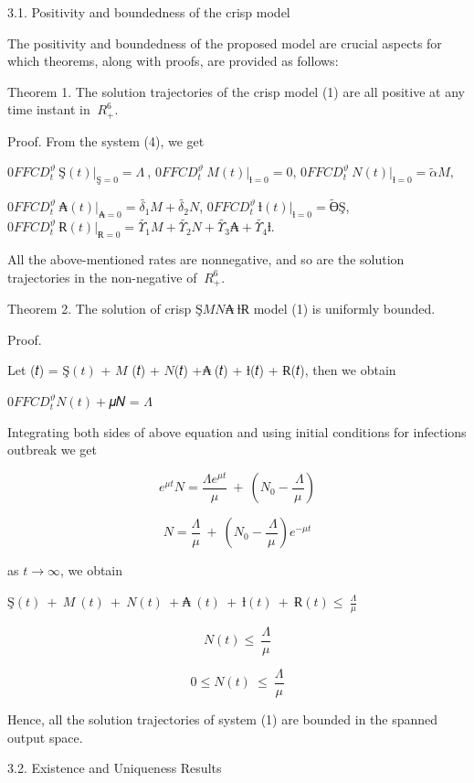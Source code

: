 3.1. Positivity and boundedness of the crisp model

The positivity and boundedness of the proposed model are crucial aspects for which theorems, along with proofs, are provided as follows:

Theorem 1. The solution trajectories of the crisp model (1) are all positive at any time instant in \({\ R}_{+}^{6}\).

Proof. From the system (4), we get

\({0FFCD_{t}^{\vartheta}\ Ş(t)|}_{Ş = 0} = \Lambda\ \), \({0FFCD_{t}^{\vartheta}\ M(t)|}_{ƚ = 0} = 0\), \({0FFCD_{t}^{\vartheta}\ N(t)|}_{ƚ = 0} = \widetilde{\alpha}M,\ \)

\({0FFCD_{t}^{\vartheta}\ ₳(t)|}_{₳ = 0} = \widetilde{\delta_{1}}M + \widetilde{\delta_{2}}N\), \({0FFCD_{t}^{\vartheta}\ ƚ(t)|}_{ƚ = 0} = \widetilde{Ө}Ş\), \({0FFCD_{t}^{\vartheta}\ Ɍ(t)|}_{Ɍ = 0} = \widetilde{\Upsilon_{1}}M + \widetilde{\Upsilon_{2}}N + \widetilde{\Upsilon_{3}}₳ + \widetilde{\Upsilon_{4}}ƚ\).

All the above-mentioned rates are nonnegative, and so are the solution trajectories in the non-negative of \({\ R}_{+}^{6}\).

Theorem 2. The solution of crisp \(ŞMN₳\ ƚɌ\) model (1) is uniformly bounded.

Proof.

Let (𝑡) = \(Ş(t)\) + \(M\) (𝑡) + \(N\)(𝑡) +\(₳\ \)(𝑡) + \(ƚ\)(𝑡) + \(Ɍ\)(𝑡), then we obtain

\(0FFCD_{t}^{\vartheta}N(t) +\)𝜇𝑁 = \(\Lambda\)

Integrating both sides of above equation and using initial conditions for infections outbreak we get

\[e^{\mu t}N = \frac{\Lambda e^{\mu t}}{\mu}\  + \ \left( N_{0} - \frac{\ \Lambda}{\mu} \right)\]

\[N = \frac{\Lambda}{\mu}\  + \ \left( N_{0} - \frac{\ \Lambda}{\mu} \right)e^{- \mu t}\]

as \(t \rightarrow \infty\), we obtain

\(Ş(t)\  + \ M\ (t)\  + \ N(t)\  + ₳\ (t)\  + \ ƚ(t)\  + \ Ɍ(t) \leq \ \frac{\Lambda}{\mu}\)

\[N(t) \leq \ \frac{\Lambda}{\mu}\]

\[0 \leq N(t)\  \leq \ \frac{\Lambda}{\mu}\]

Hence, all the solution trajectories of system (1) are bounded in the spanned output space.

3.2. Existence and Uniqueness Results


